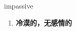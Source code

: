 
\begin{frame}
{\huge impassive}
\begin{center}
\begin{enumerate}\Large
  \item \textbf{冷漠的，无感情的}
\end{enumerate}
\end{center}
\end{frame}
